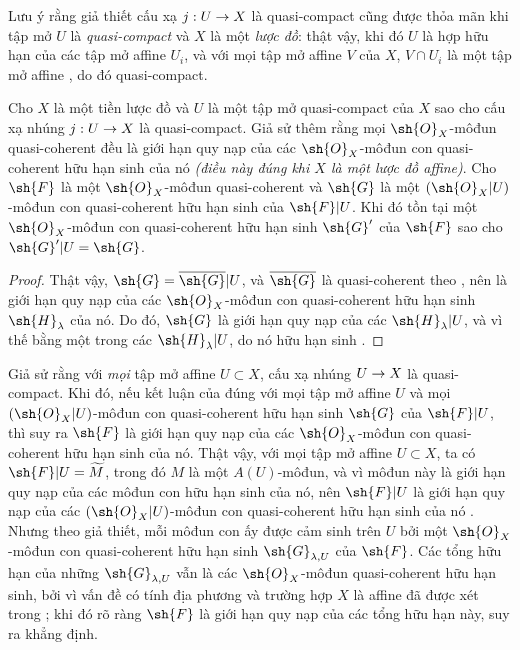 \documentclass[oneside]{amsart}
\makeatletter
\newcommand{\ega@arrow}[2]{\mathchoice{#1}{#2}{#2}{#2}}
\renewcommand{\to}{\ega@arrow{\longrightarrow}{\rightarrow}}
\newcommand{\oldpage}[2][]{{\marginnote{\normalfont\textbf{#1}~|~#2}}\ignorespaces}
\let\EGAOriginalLabel\label
\renewcommand{\label}[1]{\phantomsection\EGAOriginalLabel{#1}}
\makeatother
\begin{document}
Lưu ý rằng giả thiết cấu xạ $j:U\to X$ là quasi-compact cũng được thỏa mãn khi tập mở
$U$ là \emph{quasi-compact} và $X$ là một \emph{lược đồ}: thật vậy, khi đó $U$ là hợp
hữu hạn của các tập mở affine $U_i$, và với mọi tập mở affine $V$ của $X$,
$V\cap U_i$ là một tập mở affine , do đó quasi-compact.

\begin{corollary}[9.4.3]
\label{I.9.4.3}
Cho $X$ là một tiền lược đồ và $U$ là một tập mở quasi-compact của $X$ sao cho cấu xạ
nhúng $j:U\to X$ là quasi-compact. Giả sử thêm rằng mọi $\sh{O}_X$-môđun
quasi-coherent đều là giới hạn quy nạp của các $\sh{O}_X$-môđun con quasi-coherent
hữu hạn sinh của nó \emph{(điều này đúng khi $X$ là một \emph{lược đồ affine})}.
Cho $\sh{F}$ là một $\sh{O}_X$-môđun quasi-coherent và $\sh{G}$ là một
$(\sh{O}_X|U)$-môđun con quasi-coherent hữu hạn sinh của $\sh{F}|U$. Khi đó tồn tại
một $\sh{O}_X$-môđun con quasi-coherent hữu hạn sinh $\sh{G}'$ của $\sh{F}$ sao cho
$\sh{G}'|U=\sh{G}$.
\end{corollary}

\begin{proof}
Thật vậy, $\sh{G}=\overline{\sh{G}}|U$, và $\overline{\sh{G}}$ là quasi-coherent theo
, nên là giới hạn quy nạp của các $\sh{O}_X$-môđun con quasi-coherent
hữu hạn sinh $\sh{H}_\lambda$ của nó. Do đó, $\sh{G}$ là giới hạn quy nạp của các
$\sh{H}_\lambda|U$, và vì thế bằng một trong các $\sh{H}_\lambda|U$, do nó hữu hạn
sinh .
\end{proof}

\begin{remark}[9.4.4]
\label{I.9.4.4}
Giả sử rằng với \emph{mọi} tập mở affine $U\subset X$, cấu xạ nhúng $U\to X$ là
quasi-compact. Khi đó, nếu kết luận của  đúng với mọi tập mở affine $U$
và mọi $(\sh{O}_X|U)$-môđun con quasi-coherent hữu hạn sinh $\sh{G}$ của $\sh{F}|U$,
\oldpage[I]{175}
thì suy ra $\sh{F}$ là giới hạn quy nạp của các $\sh{O}_X$-môđun con quasi-coherent
hữu hạn sinh của nó. Thật vậy, với mọi tập mở affine $U\subset X$, ta có
$\sh{F}|U=\widetilde{M}$, trong đó $M$ là một $A(U)$-môđun, và vì môđun này là giới hạn
quy nạp của các môđun con hữu hạn sinh của nó, nên $\sh{F}|U$ là giới hạn quy nạp của
các $(\sh{O}_X|U)$-môđun con quasi-coherent hữu hạn sinh của nó .
Nhưng theo giả thiết, mỗi môđun con ấy được cảm sinh trên $U$ bởi một
$\sh{O}_X$-môđun con quasi-coherent hữu hạn sinh $\sh{G}_{\lambda,U}$ của $\sh{F}$.
Các tổng hữu hạn của những $\sh{G}_{\lambda,U}$ vẫn là các $\sh{O}_X$-môđun
quasi-coherent hữu hạn sinh, bởi vì vấn đề có tính địa phương và trường hợp $X$ là
affine đã được xét trong ; khi đó rõ ràng $\sh{F}$ là giới hạn quy nạp
của các tổng hữu hạn này, suy ra khẳng định.
\end{remark}
\end{document}
